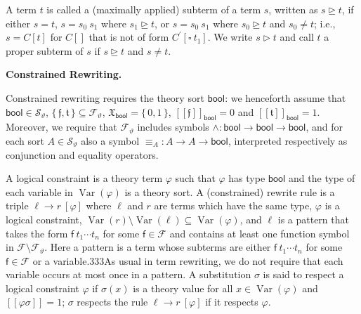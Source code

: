 \documentclass[10pt,a4paper]{amsart}
\begin{document}
 
 
A term $t$ is called a (maximally applied) subterm of a term $s$, written as $s\trianglerighteq t$, if either $s=t$, $s={s_{0}}\ {s_{1}}$ where $s_{1}\trianglerighteq t$, or $s={s_{0}}\ {s_{1}}$ where $s_{0}\trianglerighteq t$ and $s_{0}\neq t$; i.e., $s={C}[t]$ for ${C}[]$ that is not of form ${C^{\prime}}[{\square}\ {t_{1}}]$. We write $s\vartriangleright t$ and call $t$ a proper subterm of $s$ if $s\trianglerighteq t$ and $s\neq t$.\par
 
 
 
 
\par\medskip\noindent\textbf{Constrained Rewriting.}\par
 
 
Constrained rewriting requires the theory sort $\mathsf{bool}$: we henceforth assume that $\mathsf{bool}\in{\mathcal{S}}_{\vartheta}$, $\{\,\mathfrak{f},\mathfrak{t}\,\}\subseteq{\mathcal{F}}_{\vartheta}$, $\mathfrak{X}_{\mathsf{bool}}=\{\,0,1\,\}$, $[\![\mathfrak{f}]\!]_{\mathsf{bool}}=0$ and $[\![\mathfrak{t}]\!]_{\mathsf{bool}}=1$. Moreover, we require that ${\mathcal{F}}_{\vartheta}$ includes symbols $\wedge:\mathsf{bool}\rightarrow\mathsf{bool}\rightarrow\mathsf{bool}$, and for each sort $A\in{\mathcal{S}}_{\vartheta}$ also a symbol $\equiv_{A}:A\rightarrow A\rightarrow\mathsf{bool}$, interpreted respectively as conjunction and equality operators.\par
 
 
 
A logical constraint is a theory term $\varphi$ such that $\varphi$ has type $\mathsf{bool}$ and the type of each variable in $\operatorname{Var}(\varphi)$ is a theory sort. A (constrained) rewrite rule is a triple ${\ell}\rightarrow{r}\ [\varphi]$ where $\ell$ and $r$ are terms which have the same type, $\varphi$ is a logical constraint, $\operatorname{Var}(r)\setminus\operatorname{Var}(\ell)\subseteq\operatorname{Var}(\varphi)$, and $\ell$ is a pattern that takes the form ${\mathsf{f}}\ {{t}_{1}\cdots{t}_{n}}$ for some $\mathsf{f}\in\mathcal{F}$ and contains at least one function symbol in $\mathcal{F}\setminus{\mathcal{F}}_{\vartheta}$. Here a pattern is a term whose subterms are either ${\mathsf{f}}\ {{t}_{1}\cdots{t}_{n}}$ for some $\mathsf{f}\in\mathcal{F}$ or a variable.333As usual in term rewriting, we do not require that each variable occurs at most once in a pattern. A substitution $\sigma$ is said to respect a logical constraint $\varphi$ if $\sigma(x)$ is a theory value for all $x\in\operatorname{Var}(\varphi)$ and $[\![\varphi\sigma]\!]=1$; $\sigma$ respects the rule ${\ell}\rightarrow{r}\ [\varphi]$ if it respects $\varphi$.\par
 
\end{document}
